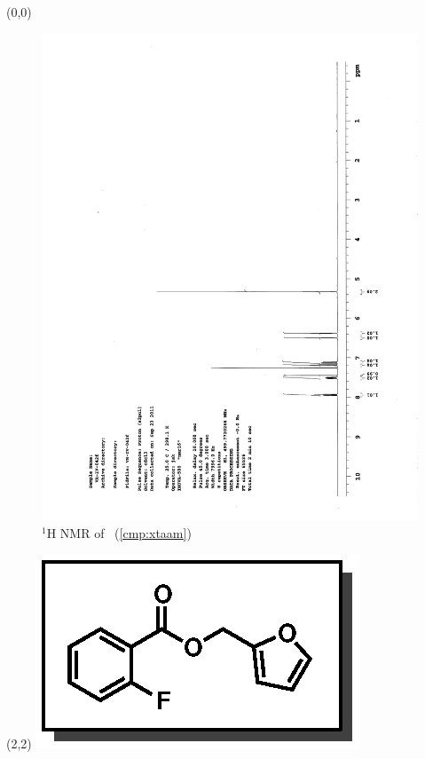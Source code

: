 \begin{textblock}{20}(0,0)
\begin{figure}[htb]
\caption{$^1$H NMR of \CMPxtaam\ (\ref{cmp:xtaam})}
\includegraphics[scale=0.75, trim = 0mm 0mm 0mm 5mm,
clip]{chp_asymmetric/images/nmr/xtaamH}
\vspace{-100pt}
\end{figure}
\end{textblock}
\begin{textblock}{1}(2,2)
\includegraphics[scale=0.8, angle=90]{chp_asymmetric/images/xtaam}
\end{textblock}
